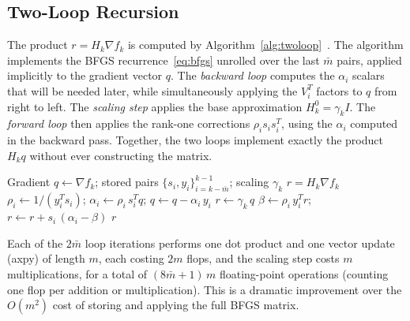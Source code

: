 \subsection{Two-Loop Recursion}

\noindent The product $r = H_k \nabla f_k$ is computed by
Algorithm~\ref{alg:twoloop}~\cite[Algorithm~9.1]{nocedal2006numerical}. The
algorithm implements the BFGS recurrence~\eqref{eq:bfgs} unrolled over the last
$\bar{m}$ pairs, applied implicitly to the gradient vector $q$. The
\emph{backward loop} computes the $\alpha_i$ scalars that will be needed later,
while simultaneously applying the $V_i^T$ factors to $q$ from right to left. The
\emph{scaling step} applies the base approximation $H_k^0 = \gamma_k I$. The
\emph{forward loop} then applies the rank-one corrections $\rho_i s_i s_i^T$,
using the $\alpha_i$ computed in the backward pass. Together, the two loops
implement exactly the product $H_k q$ without ever constructing the matrix.

\begin{algorithm}[H]
\caption{L-BFGS Two-Loop
  Recursion~\cite[Algorithm~9.1]{nocedal2006numerical}}
\label{alg:twoloop}
\begin{algorithmic}[1]
    \Require Gradient $q \gets \nabla f_k$;\;
             stored pairs $\{s_i, y_i\}_{i=k-\bar{m}}^{k-1}$;\;
             scaling $\gamma_k$
    \Ensure  $r = H_k \nabla f_k$
        \State $\rho_i \gets 1/(y_i^T s_i)$;\quad
               $\alpha_i \gets \rho_i\, s_i^T q$;\quad
               $q \gets q - \alpha_i\, y_i$
    \EndFor
    \State $r \gets \gamma_k\, q$
        \State $\beta \gets \rho_i\, y_i^T r$;\quad
               $r \gets r + s_i\,(\alpha_i - \beta)$
    \EndFor
    \State \Return $r$
\end{algorithmic}
\end{algorithm}

\noindent Each of the $2\bar{m}$ loop iterations performs one dot product and
one vector update (axpy) of length $m$, each costing $2m$ flops, and the
scaling step costs $m$ multiplications, for a total of $(8\bar{m}+1)\,m$
floating-point operations (counting one flop per addition or
multiplication). This is a dramatic improvement over the $O(m^2)$ cost of
storing and applying the full BFGS matrix.


